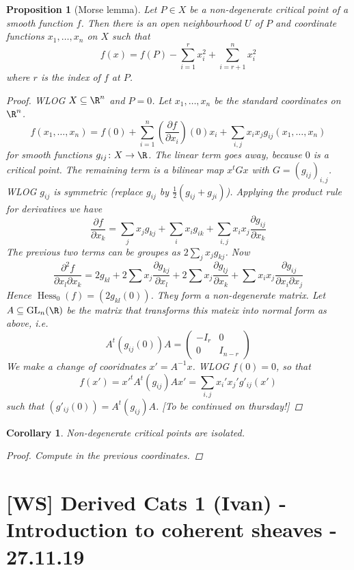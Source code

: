 \documentclass[A4paper, british]{amsart}
\theoremstyle{darkgreentheorem}
\newtheorem{prop}[thm]{Proposition}
\newtheorem{cor}[thm]{Corollary}
\theoremstyle{darkbluedefinition}
\theoremstyle{darkredexample}
\theoremstyle{remark}
\DeclareMathOperator{\Hess}{Hess}
\newcommand{\1}{\mathbbm{1}}
\newcommand{\sub}{\subseteq}
\begin{document}
\begin{prop}[Morse lemma]
    Let $P\in X$ be a non-degenerate critical point of a smooth function $f$.
    Then there is an open neighbourhood $U$ of $P$ and coordinate functions $x_{1},\ldots,x_{n}$ on $X$ such that
    \[ f(x)=f(P)-\sum_{i=1}^{r}x_{i}^{2}+\sum_{i=r+1}^{n}x_{i}^{2} \]
    where $r$ is the index of $f$ at $P$.
    \begin{proof}
	WLOG $X\sub \R^{n}$ and $P=0$.
	Let $x_{1},\ldots,x_{n}$ be the standard coordinates on $\R^{n}$.
	\[ f(x_{1},\ldots,x_{n})=f(0)+\sum_{i=1}^{n}(\frac{\partial f}{\partial x_{i}})(0)x_{i}+\sum_{i,j}x_{i}x_{j}g_{ij}(x_{1},\ldots,x_{n}) \]
	for smooth functions $g_{ij}\colon X\to \R$.
	The linear term goes away, because $0$ is a critical point.
	The remaining term is a bilinear map $x^{t}Gx$ with $G=(g_{ij})_{i,j}$.
	WLOG $g_{ij}$ is symmetric (replace $g_{ij}$ by $\frac{1}{2}(g_{ij}+g_{ji})$).
	Applying the product rule for derivatives we have
	\[ \frac{\partial f}{\partial x_{k}}=\sum_{j}x_{j}g_{kj}+\sum_{i}x_{i}g_{ik}+\sum_{i,j}x_{i}x_{j}\frac{\partial g_{ij}}{\partial x_{k}} \]
	The previous two terms can be groupes as $2\sum_{j}x_{j}g_{kj}$.
	Now
	\[ \frac{\partial^{2} f}{\partial x_{l}\partial x_{k}}=2g_{kl}+2\sum x_{j}\frac{\partial g_{kj}}{\partial x_{l}} +2\sum x_{j}\frac{\partial g_{lj}}{\partial x_{k}}+\sum x_{i}x_{j}\frac{\partial g_{ij}}{\partial x_{i}\partial x_{j}} \]
	Hence $\Hess_{0}(f)=(2g_{kl}(0))$.
	They form a non-degenerate matrix.
	Let $A\sub \operatorname{GL}_{n}(\R)$ be the matrix that transforms this mateix into normal form as above, i.e.
	\[ A^{t}(g_{ij}(0))A=\begin{pmatrix} -I_{r} & 0 \\ 0 & I_{n-r}\end{pmatrix} \]
	We make a change of cooridnates $x'=A^{-1}x$.
	WLOG $f(0)=0$, so that
	\[ f(x')=x'^{t}A^{t}(g_{ij})Ax'=\sum_{i,j}x_{i}'x_{j}'g'_{ij}(x') \]
	such that $(g'_{ij}(0))=A^{t}(g_{ij})A$.
	[To be continued on thursday!]
    \end{proof}
\end{prop}

\begin{cor}
    Non-degenerate critical points are isolated.
    \begin{proof}
	Compute in the previous coordinates.
    \end{proof}
\end{cor}

\section{[WS] Derived Cats 1 (Ivan) - Introduction to coherent sheaves - 27.11.19}
\end{document}
